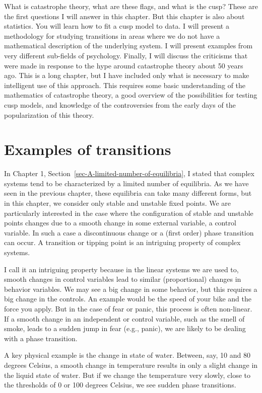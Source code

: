\documentclass[
  a4paper,
  DIV=11,
  numbers=noendperiod,
  oneside]{scrreprt}
\begin{document}
What is catastrophe theory, what are these flags, and what is the cusp?
These are the first questions I will answer in this chapter. But this
chapter is also about statistics. You will learn how to fit a cusp model
to data. I will present a methodology for studying transitions in areas
where we do not have a mathematical description of the underlying
system. I will present examples from very different sub-fields of
psychology. Finally, I will discuss the criticisms that were made in
response to the hype around catastrophe theory about 50 years ago. This
is a long chapter, but I have included only what is necessary to make
intelligent use of this approach. This requires some basic understanding
of the mathematics of catastrophe theory, a good overview of the
possibilities for testing cusp models, and knowledge of the
controversies from the early days of the popularization of this theory.

\hypertarget{sec-Examples-of-transitions}{%
\section{Examples of transitions}\label{sec-Examples-of-transitions}}

In Chapter 1, Section~\ref{sec-A-limited-number-of-equilibria}, I stated
that complex systems tend to be characterized by a limited number of
equilibria. As we have seen in the previous chapter, these equilibria
can take many different forms, but in this chapter, we consider only
stable and unstable fixed points. We are particularly interested in the
case where the configuration of stable and unstable points changes due
to a smooth change in some external variable, a control variable. In
such a case a discontinuous change or a (first order) phase transition
can occur. A transition or tipping point is an intriguing property of
complex systems.

I call it an intriguing property because in the linear systems we are
used to, smooth changes in control variables lead to similar
(proportional) changes in behavior variables. We may see a big change in
some behavior, but this requires a big change in the controls. An
example would be the speed of your bike and the force you apply. But in
the case of fear or panic, this process is often non-linear. If a smooth
change in an independent or control variable, such as the smell of
smoke, leads to a sudden jump in fear (e.g., panic), we are likely to be
dealing with a phase transition.

A key physical example is the change in state of water. Between, say, 10
and 80 degrees Celsius, a smooth change in temperature results in only a
slight change in the liquid state of water. But if we change the
temperature very slowly, close to the thresholds of 0 or 100 degrees
Celsius, we see sudden phase transitions.
\end{document}
